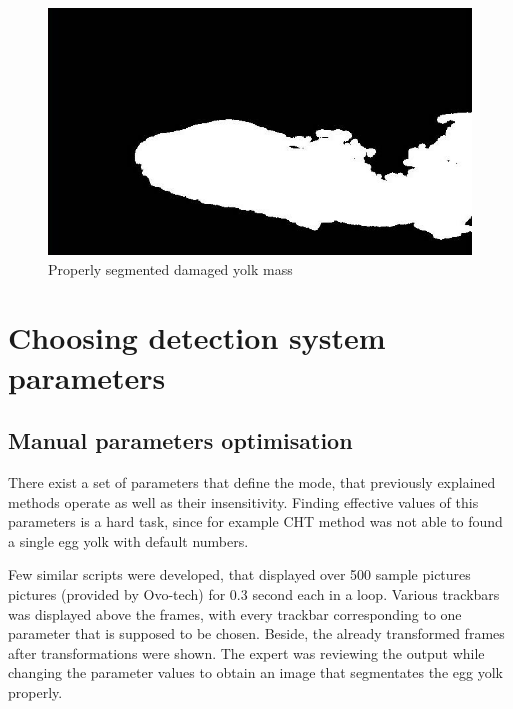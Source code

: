 \documentclass[12pt,twoside,a4paper]{article}
\begin{document}
\begin{figure}[H]
\centering
\includegraphics[width=0.4\paperwidth]{bad}
\caption{Properly segmented damaged yolk mass}\label{fig:bad}
\end{figure}

\section{Choosing detection system parameters}
\subsection{Manual parameters optimisation}

There exist a set of parameters that define the mode, that previously explained methods operate as well as their insensitivity.
Finding effective values of this parameters is a hard task, since for example CHT method was not able to found a single egg yolk with default numbers.


Few similar scripts were developed, that displayed over 500 sample pictures pictures (provided by Ovo-tech) for 0.3 second each in a loop.
Various trackbars was displayed above the frames, with every trackbar corresponding to one parameter that is supposed to be chosen.
Beside, the already transformed frames after transformations were shown.
The expert was reviewing the output while changing the parameter values to obtain an image that segmentates the egg yolk properly.
\end{document}
